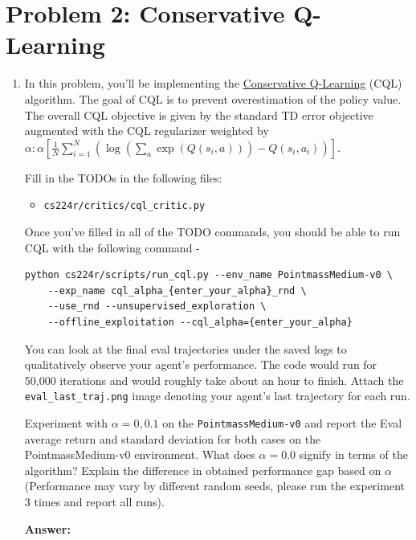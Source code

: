\documentclass[12pt]{article}
\newcommand{\answer}[1]{{\bf \color{red}Answer:\\ #1}}
\begin{document}
\section*{Problem 2: Conservative Q-Learning}
\begin{enumerate}
\item In this problem, you'll be implementing the \href{https://arxiv.org/abs/2006.04779}{Conservative Q-Learning} (CQL) algorithm. The goal of CQL is to prevent overestimation of the policy value. The overall CQL objective is given by the standard TD error objective augmented with the CQL regularizer weighted by $\alpha: \alpha\left[\frac{1}{N} \sum_{i=1}^N\left(\log \left(\sum_a \exp \left(Q\left(s_i, a\right)\right)\right)-Q\left(s_i, a_i\right)\right)\right]$. 

Fill in the TODOs in the following files:
\begin{itemize}
    \item \texttt{cs224r/critics/cql\_critic.py}
\end{itemize}

Once you’ve filled in all of the TODO commands, you should be able to run CQL with the following command - 
\begin{tcolorbox}[width=\linewidth, sharp corners=all, colback=white!95!black]
\begin{verbatim}
python cs224r/scripts/run_cql.py --env_name PointmassMedium-v0 \
    --exp_name cql_alpha_{enter_your_alpha}_rnd \
    --use_rnd --unsupervised_exploration \
    --offline_exploitation --cql_alpha={enter_your_alpha}
\end{verbatim}
\end{tcolorbox}

\noindent
You can look at the final eval trajectories under the saved logs to qualitatively observe your agent's performance. The code would run for 50,000 iterations and would roughly take about an hour to finish. Attach the \texttt{eval\_last\_traj.png} image denoting your agent's last trajectory for each run.  %

\noindent
Experiment with $\alpha = 0, 0.1$ on the \texttt{PointmassMedium-v0} and report the Eval average return and standard deviation for both cases on the PointmassMedium-v0 environment. What does $\alpha=0.0$ signify in terms of the algorithm? Explain the difference in obtained performance gap based on $\alpha$ (Performance may vary by different random seeds, please run the experiment 3 times and report all runs).

\answer{}


\end{enumerate}
\end{document}
